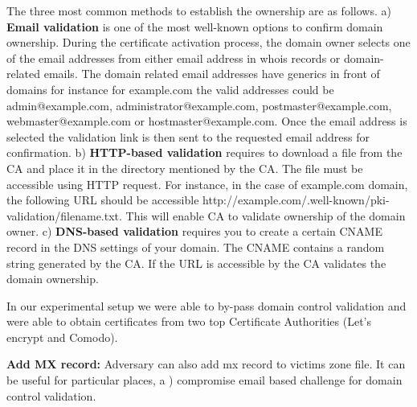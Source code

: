 The three most common methods to establish the ownership are as follows. 
a) \textbf {Email validation} is one of the most well-known options to confirm domain ownership. During the certificate activation process, the domain owner selects one of the email addresses from either email address in whois records or domain-related emails. The domain related email addresses have generics in front of domains for instance for example.com  the valid addresses could be admin@example.com, administrator@example.com, postmaster@example.com, webmaster@example.com or hostmaster@example.com. Once the email address is selected the validation link is then sent to the requested email address for confirmation. b) \textbf{HTTP-based validation} requires to download a file from the CA and place it in the directory mentioned by the CA. The file must be accessible using HTTP request. For instance, in the case of example.com domain, the following URL should be accessible http://example.com/.well-known/pki-validation/filename.txt. This will enable CA to validate ownership of the domain owner. c) \textbf{DNS-based validation} requires you to create a certain CNAME record in the DNS settings of your domain. The CNAME contains a random string generated by the CA. If the URL is accessible by the CA validates the domain ownership. 


In our experimental setup we were able to by-pass domain control validation and were able to obtain certificates from two top Certificate Authorities (Let's encrypt and Comodo). %

\textbf{ Add MX record:} 
Adversary can also add mx record to victims zone file. It can be useful for particular places, a ) compromise email based challenge for domain control validation. %


